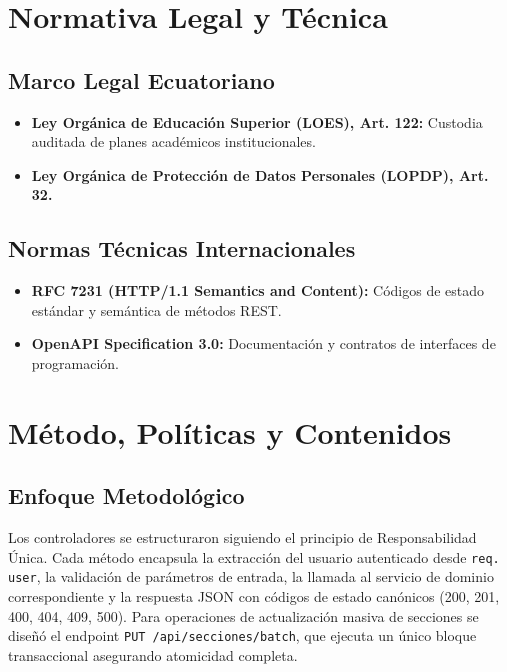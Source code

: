 \documentclass[12pt,a4paper]{article}
\begin{document}
\section{Normativa Legal y Técnica}
\subsection{Marco Legal Ecuatoriano}
\begin{itemize}[leftmargin=1.5em, itemsep=2pt]
    \item \textbf{Ley Orgánica de Educación Superior (LOES), Art. 122:} Custodia auditada de planes académicos institucionales.
    \item \textbf{Ley Orgánica de Protección de Datos Personales (LOPDP), Art. 32.}
\end{itemize}
\subsection{Normas Técnicas Internacionales}
\begin{itemize}[leftmargin=1.5em, itemsep=2pt]
    \item \textbf{RFC 7231 (HTTP/1.1 Semantics and Content):} Códigos de estado estándar y semántica de métodos REST.
    \item \textbf{OpenAPI Specification 3.0:} Documentación y contratos de interfaces de programación.
\end{itemize}

\section{Método, Políticas y Contenidos}
\subsection{Enfoque Metodológico}
Los controladores se estructuraron siguiendo el principio de Responsabilidad Única. Cada método encapsula la extracción del usuario autenticado desde \texttt{req. user}, la validación de parámetros de entrada, la llamada al servicio de dominio correspondiente y la respuesta JSON con códigos de estado canónicos (200, 201, 400, 404, 409, 500). Para operaciones de actualización masiva de secciones se diseñó el endpoint \texttt{PUT /\allowbreak  api/\allowbreak  secciones/\allowbreak  batch}, que ejecuta un único bloque transaccional asegurando atomicidad completa.
\end{document}
